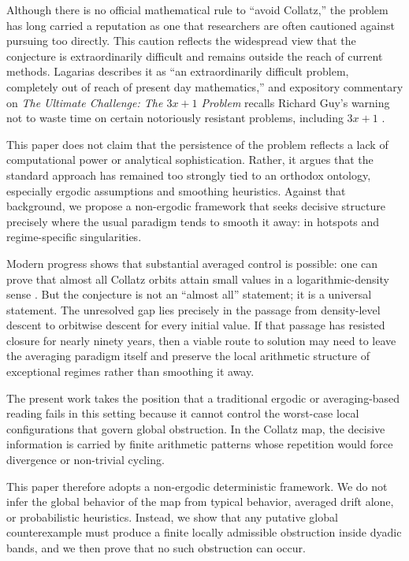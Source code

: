 \documentclass[preprint,12pt]{elsarticle}
\begin{document}
Although there is no official mathematical rule to ``avoid Collatz,'' the problem has long carried a reputation as one that researchers are often cautioned against pursuing too directly. This caution reflects the widespread view that the conjecture is extraordinarily difficult and remains outside the reach of current methods. Lagarias describes it as ``an extraordinarily difficult problem, completely out of reach of present day mathematics,'' and expository commentary on \emph{The Ultimate Challenge: The $3x+1$ Problem} recalls Richard Guy's warning not to waste time on certain notoriously resistant problems, including $3x+1$ \cite{Lagarias1985,Lagarias2010}.

This paper does not claim that the persistence of the problem reflects a lack of computational power or analytical sophistication. Rather, it argues that the standard approach has remained too strongly tied to an orthodox ontology, especially ergodic assumptions and smoothing heuristics. Against that background, we propose a non-ergodic framework that seeks decisive structure precisely where the usual paradigm tends to smooth it away: in hotspots and regime-specific singularities.

Modern progress shows that substantial averaged control is possible: one can prove that almost all Collatz orbits attain small values in a logarithmic-density sense \cite{Tao2019}. But the conjecture is not an ``almost all'' statement; it is a universal statement. The unresolved gap lies precisely in the passage from density-level descent to orbitwise descent for every initial value. If that passage has resisted closure for nearly ninety years, then a viable route to solution may need to leave the averaging paradigm itself and preserve the local arithmetic structure of exceptional regimes rather than smoothing it away.

The present work takes the position that a traditional ergodic or averaging-based reading fails in this setting because it cannot control the worst-case local configurations that govern global obstruction. In the Collatz map, the decisive information is carried by finite arithmetic patterns whose repetition would force divergence or non-trivial cycling.

This paper therefore adopts a non-ergodic deterministic framework. We do not infer the global behavior of the map from typical behavior, averaged drift alone, or probabilistic heuristics. Instead, we show that any putative global counterexample must produce a finite locally admissible obstruction inside dyadic bands, and we then prove that no such obstruction can occur.
\end{document}

